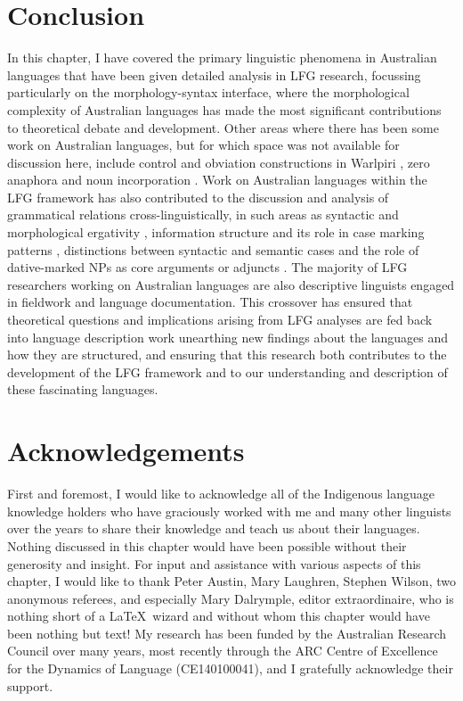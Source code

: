 \documentclass[output=paper,hidelinks]{langscibook}
\begin{document}
\section{Conclusion}
In this chapter, I have covered the primary linguistic phenomena in Australian languages that have been given detailed analysis in LFG research, focussing particularly on the morphology-syntax interface, where the morphological complexity of Australian languages has made the most significant contributions to theoretical debate and development.  Other areas where there has been some work on Australian languages, but for which space was not available for discussion here, include control and obviation constructions in Warlpiri \citep{SimpBres1983}, zero anaphora \citep{Austin2001} and noun incorporation \citep{NordSadl2008,BakeNord2008,Egmond2008,Bakeretal2010}. Work on Australian languages within the LFG framework has also contributed to the discussion and analysis of grammatical relations cross-linguistically, in such areas as syntactic and morphological ergativity \citep{Manning1996}, information structure and its role in case marking patterns \citep{Simpson2012}, distinctions between syntactic and semantic cases \citep{Andrews2017} and the role of dative-marked NPs as core arguments or adjuncts \citep{Simpson1991}. The majority of LFG researchers working on Australian languages are also descriptive linguists engaged in fieldwork and language documentation. This crossover has ensured that theoretical questions and implications arising from LFG analyses are fed back into language description work unearthing new findings about the languages and how they are structured, and ensuring that this research both contributes to the development of the LFG framework and to our understanding and description of these fascinating languages.

\section*{Acknowledgements}
First and foremost, I would like to acknowledge all of the Indigenous language knowledge holders who have graciously worked with me and many other linguists over the years to share their knowledge and teach us about their languages. Nothing discussed in this chapter would have been possible without their generosity and insight. For input and assistance with various aspects of this chapter, I would like to thank Peter Austin, Mary Laughren, Stephen Wilson, two anonymous referees, and especially Mary Dalrymple, editor extraordinaire, who is nothing short of a \LaTeX\ wizard and without whom this chapter would have been nothing but text! My research has been funded by the Australian Research Council over many years, most recently through the ARC Centre of Excellence for the Dynamics of Language (CE140100041), and I gratefully acknowledge their support.
\end{document}
